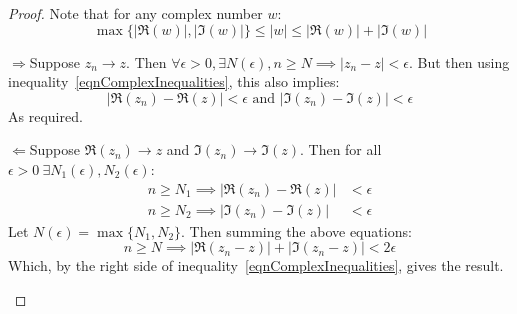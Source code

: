 \documentclass[../Main.tex]{subfiles}
\begin{document}
\begin{proof}
    Note that for any complex number $w$:
    \begin{equation}
        \max{\{|\Re(w)|, |\Im(w)|\}} \leq |w| \leq |\Re(w)| + |\Im(w)|
        \label{eqnComplexInequalities}
    \end{equation}
    \begin{proofdirection}{$\Rightarrow$}{Suppose $z_n \rightarrow z$.}
        Then $\forall \epsilon > 0, \exists N(\epsilon), n \geq N \implies |z_n - z| < \epsilon$. But then using inequality~\ref{eqnComplexInequalities}, this also implies:
        \begin{equation*}
            |\Re(z_n) - \Re(z)| < \epsilon \text{ and } |\Im(z_n) - \Im(z)| < \epsilon
        \end{equation*}
        As required.
    \end{proofdirection}
    \begin{proofdirection}{$\Leftarrow$}{Suppose $\Re(z_n) \rightarrow z$ and $\Im(z_n) \rightarrow \Im(z)$.}
        Then for all $\epsilon > 0~\exists N_1(\epsilon), N_2(\epsilon)$:
        \begin{align*}
            n \geq N_1 \implies |\Re(z_n) - \Re(z)| &< \epsilon \\
            n \geq N_2 \implies |\Im(z_n) - \Im(z)| &< \epsilon
        \end{align*}
        Let $N(\epsilon) = \max{\{N_1, N_2\}}$. Then summing the above equations:
        \begin{equation*}
            n \geq N \implies |\Re(z_n - z)| + |\Im(z_n - z)| < 2\epsilon
        \end{equation*}
        Which, by the right side of inequality~\ref{eqnComplexInequalities}, gives the result.
    \end{proofdirection}
\end{proof}
\end{document}
